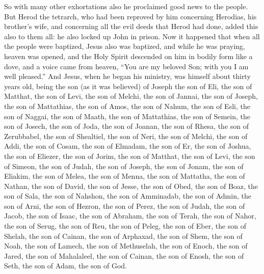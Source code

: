 \begin{biblechapter}
\verse So with many other exhortations also he proclaimed good news to the people.
\verse But Herod the tetrarch, who had been reproved by him concerning Herodias, his brother’s wife, and concerning all the evil deeds that Herod had done,
\verse added this also to them all: he also locked up John in prison.
 Now it happened that when all the people were baptized, Jesus also was baptized, and while he was praying, heaven was opened,
\verse and the Holy Spirit descended on him in bodily form like a dove, and a voice came from heaven, “You are my beloved Son; with you I am well pleased.”
 And Jesus, when he began his ministry, was himself about thirty years old, being the son (as it was believed) of Joseph the son of Eli,
\verse the son of Matthat, the son of Levi, the son of Melchi, the son of Jannai, the son of Joseph,
\verse the son of Mattathias, the son of Amos, the son of Nahum, the son of Esli, the son of Naggai,
\verse the son of Maath, the son of Mattathias, the son of Semein, the son of Josech, the son of Joda,
\verse the son of Joanan, the son of Rhesa, the son of Zerubbabel, the son of Shealtiel, the son of Neri,
\verse the son of Melchi, the son of Addi, the son of Cosam, the son of Elmadam, the son of Er,
\verse the son of Joshua, the son of Eliezer, the son of Jorim, the son of Matthat, the son of Levi,
\verse the son of Simeon, the son of Judah, the son of Joseph, the son of Jonam, the son of Eliakim,
\verse the son of Melea, the son of Menna, the son of Mattatha, the son of Nathan, the son of David,
\verse the son of Jesse, the son of Obed, the son of Boaz, the son of Sala, the son of Nahshon,
\verse the son of Amminadab, the son of Admin, the son of Arni, the son of Hezron, the son of Perez, the son of Judah,
\verse the son of Jacob, the son of Isaac, the son of Abraham, the son of Terah, the son of Nahor,
\verse the son of Serug, the son of Reu, the son of Peleg, the son of Eber, the son of Shelah,
\verse the son of Cainan, the son of Arphaxad, the son of Shem, the son of Noah, the son of Lamech,
\verse the son of Methuselah, the son of Enoch, the son of Jared, the son of Mahalaleel, the son of Cainan,
\verse the son of Enosh, the son of Seth, the son of Adam, the son of God.
\end{biblechapter}

